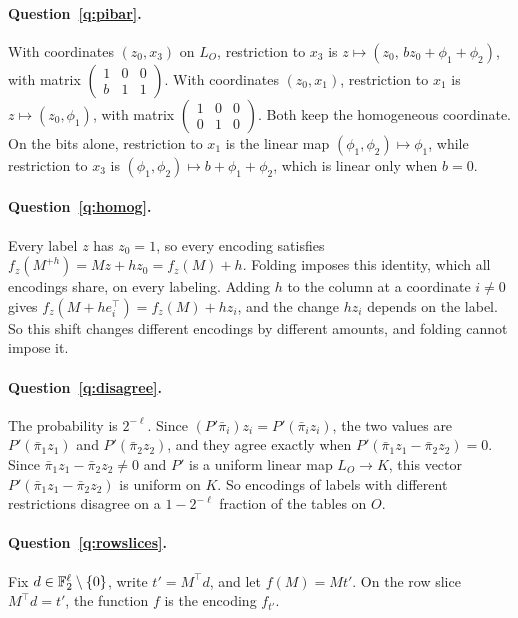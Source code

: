 \paragraph{Question~\ref{q:pibar}.} With coordinates $(z_0,x_3)$ on $L_O$, restriction to $x_3$ is $z\mapsto(z_0,\,bz_0+\phi_1+\phi_2)$, with matrix $\begin{pmatrix}1&0&0\\ b&1&1\end{pmatrix}$. With coordinates $(z_0,x_1)$, restriction to $x_1$ is $z\mapsto(z_0,\phi_1)$, with matrix $\begin{pmatrix}1&0&0\\0&1&0\end{pmatrix}$. Both keep the homogeneous coordinate. On the bits alone, restriction to $x_1$ is the linear map $(\phi_1,\phi_2)\mapsto\phi_1$, while restriction to $x_3$ is $(\phi_1,\phi_2)\mapsto b+\phi_1+\phi_2$, which is linear only when $b=0$.

\paragraph{Question~\ref{q:homog}.} Every label $z$ has $z_0=1$, so every encoding satisfies $f_z(M^{+h})=Mz+hz_0=f_z(M)+h$. Folding imposes this identity, which all encodings share, on every labeling. Adding $h$ to the column at a coordinate $i\ne0$ gives $f_z(M+he_i^\top)=f_z(M)+hz_i$, and the change $hz_i$ depends on the label. So this shift changes different encodings by different amounts, and folding cannot impose it.

\paragraph{Question~\ref{q:disagree}.} The probability is $2^{-\ell}$. Since $(P'\bar\pi_i)z_i=P'(\bar\pi_iz_i)$, the two values are $P'(\bar\pi_1z_1)$ and $P'(\bar\pi_2z_2)$, and they agree exactly when $P'(\bar\pi_1z_1-\bar\pi_2z_2)=0$. Since $\bar\pi_1z_1-\bar\pi_2z_2\ne0$ and $P'$ is a uniform linear map $L_O\to K$, this vector $P'(\bar\pi_1z_1-\bar\pi_2z_2)$ is uniform on $K$. So encodings of labels with different restrictions disagree on a $1-2^{-\ell}$ fraction of the tables on $O$.

\paragraph{Question~\ref{q:rowslices}.} Fix $d\in\mathbb{F}_2^\ell\setminus\{0\}$, write $t'=M^\top d$, and let $f(M)=Mt'$. On the row slice $M^\top d=t'$, the function $f$ is the encoding $f_{t'}$.

